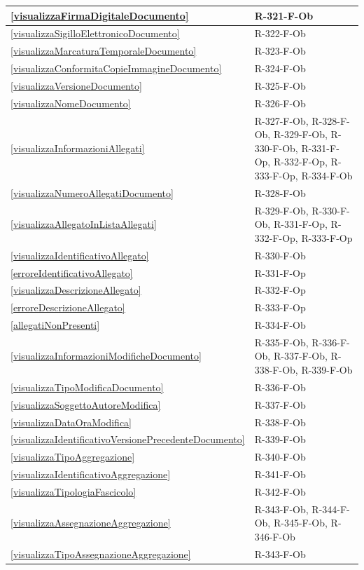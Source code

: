 \begin{longtable}{|p{4cm}|p{10cm}|}
\hline
\ref{visualizzaFirmaDigitaleDocumento} & R-321-F-Ob \\
\hline
\ref{visualizzaSigilloElettronicoDocumento} & R-322-F-Ob \\
\hline
\ref{visualizzaMarcaturaTemporaleDocumento} & R-323-F-Ob \\
\hline
\ref{visualizzaConformitaCopieImmagineDocumento} & R-324-F-Ob \\
\hline
\ref{visualizzaVersioneDocumento} & R-325-F-Ob \\
\hline
\ref{visualizzaNomeDocumento} & R-326-F-Ob \\
\hline
\ref{visualizzaInformazioniAllegati} & R-327-F-Ob, R-328-F-Ob, R-329-F-Ob, R-330-F-Ob, R-331-F-Op, R-332-F-Op, R-333-F-Op, R-334-F-Ob \\
\hline
\ref{visualizzaNumeroAllegatiDocumento} & R-328-F-Ob \\
\hline
\ref{visualizzaAllegatoInListaAllegati} & R-329-F-Ob, R-330-F-Ob, R-331-F-Op, R-332-F-Op, R-333-F-Op \\
\hline
\ref{visualizzaIdentificativoAllegato} & R-330-F-Ob \\
\hline
\ref{erroreIdentificativoAllegato} & R-331-F-Op \\
\hline
\ref{visualizzaDescrizioneAllegato} & R-332-F-Op \\
\hline
\ref{erroreDescrizioneAllegato} & R-333-F-Op \\
\hline
\ref{allegatiNonPresenti} & R-334-F-Ob \\
\hline
\ref{visualizzaInformazioniModificheDocumento} & R-335-F-Ob, R-336-F-Ob, R-337-F-Ob, R-338-F-Ob, R-339-F-Ob \\
\hline
\ref{visualizzaTipoModificaDocumento} & R-336-F-Ob \\
\hline
\ref{visualizzaSoggettoAutoreModifica} & R-337-F-Ob \\
\hline
\ref{visualizzaDataOraModifica} & R-338-F-Ob \\
\hline
\ref{visualizzaIdentificativoVersionePrecedenteDocumento} & R-339-F-Ob \\
\hline
\ref{visualizzaTipoAggregazione} & R-340-F-Ob \\
\hline
\ref{visualizzaIdentificativoAggregazione} & R-341-F-Ob \\
\hline
\ref{visualizzaTipologiaFascicolo} & R-342-F-Ob \\
\hline
\ref{visualizzaAssegnazioneAggregazione} & R-343-F-Ob, R-344-F-Ob, R-345-F-Ob, R-346-F-Ob \\
\hline
\ref{visualizzaTipoAssegnazioneAggregazione} & R-343-F-Ob \\

\end{longtable}
